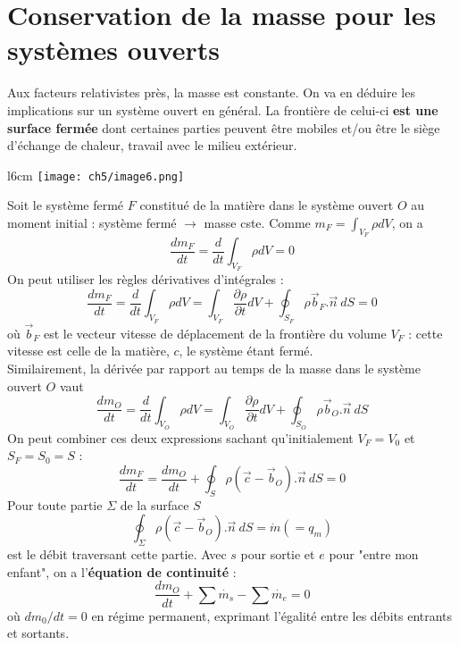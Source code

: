 \section{Conservation de la masse pour les systèmes ouverts}
Aux facteurs relativistes près, la masse est constante. On va en 
déduire les implications sur un système ouvert en général. La frontière 
de celui-ci \textbf{est une surface fermée} dont certaines parties 
peuvent être mobiles et/ou être le siège d'échange de chaleur, travail 
avec le milieu extérieur.\\
\begin{wrapfigure}[13]{l}{6cm}
	\texttt{[image: ch5/image6.png]}
\end{wrapfigure}
Soit le système fermé $F$ constitué de la matière dans le système 
ouvert $O$ au moment initial : système fermé $\rightarrow$ masse cste. 
Comme $m_F = \int_{V_F} \rho dV$, on a
\begin{equation}
\frac{dm_F}{dt} = \frac{d}{dt}\int_{V_F} \rho dV = 0
\end{equation}
On peut utiliser les règles dérivatives d'intégrales :
\begin{equation}
\frac{dm_F}{dt}=\frac{d}{dt}\int_{V_F}\rho dV = \int_{V_F}\frac{\partial 
\rho}{\partial t}dV + \oint_{S_F} \rho\vec{b}_F.\vec{n}\ dS = 0
\end{equation}
où $\vec{b}_F$ est le vecteur vitesse de déplacement de la frontière 
du volume $V_F$ : cette vitesse est celle de la matière, $c$, le système 
étant fermé.\\
Similairement, la dérivée par rapport au temps de la masse dans le 
système ouvert $O$ vaut 
\begin{equation}
\frac{dm_O}{dt}=\frac{d}{dt}\int_{V_O}\rho dV = \int_{V_O}\frac{\partial 
\rho}{\partial t}dV + \oint_{S_O} \rho\vec{b}_O.\vec{n}\ dS
\end{equation}
On peut combiner ces deux expressions sachant qu'initialement $V_F=V_0$ 
et $S_F=S_0=S$ :
\begin{equation}
\frac{dm_F}{dt} = \frac{dm_O}{dt} + \oint_S\rho(\vec{c}-\vec{b}_O).\vec 
n\ dS =0
\end{equation}
Pour toute partie $\Sigma$ de la surface $S$
\begin{equation}
\oint_\Sigma \rho(\vec{c}-\vec{b}_O).\vec{n}\ dS = \dot{m} (=q_m)
\end{equation}
est le débit traversant cette partie. Avec $s$ pour sortie et $e$ pour 
"entre mon enfant", on a l'\textbf{équation de continuité} :
\begin{equation}
\frac{dm_O}{dt} + \sum \dot{m_s} - \sum \dot{m_e} = 0
\end{equation}
où $dm_0/dt=0$ en régime permanent, exprimant l'égalité entre les débits 
entrants et sortants.

